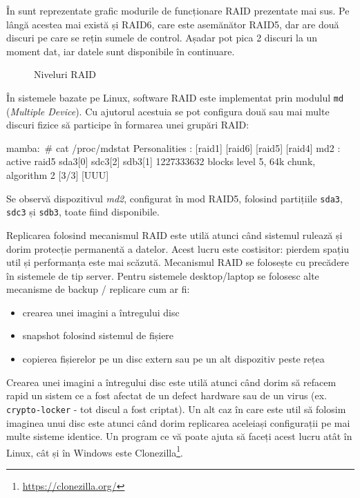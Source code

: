 În  sunt reprezentate grafic modurile de
funcționare RAID prezentate mai sus. Pe lângă acestea mai există și RAID6, care
este asemănător RAID5, dar are două discuri pe care se rețin sumele de control. Așadar
pot pica 2 discuri la un moment dat, iar datele sunt disponibile în continuare.

\begin{figure}[htbp]
  \centering
  \def\svgwidth{\columnwidth}
  
  \caption{Niveluri RAID}
  \label{fig:storage:raid}
\end{figure}

În sistemele bazate pe Linux, software RAID este implementat prin modulul \texttt{md}
(\textit{Multiple Device}). Cu ajutorul acestuia se pot configura două sau mai multe
discuri fizice să participe în formarea unei grupări RAID:

\begin{screen}
mamba:~# cat /proc/mdstat
Personalities : [raid1] [raid6] [raid5] [raid4]
md2 : active raid5 sda3[0] sdc3[2] sdb3[1]
      1227333632 blocks level 5, 64k chunk, algorithm 2 [3/3] [UUU]
\end{screen}

Se observă dispozitivul \textit{md2}, configurat în mod RAID5, folosind
partițiile \texttt{sda3}, \texttt{sdc3} și \texttt{sdb3}, toate fiind disponibile.

Replicarea folosind mecanismul RAID este utilă atunci când sistemul rulează și
dorim protecție permanentă a datelor. Acest lucru este costisitor: pierdem
spațiu util și performanța este mai scăzută. Mecanismul RAID se folosește cu
precădere în sistemele de tip server. Pentru sistemele desktop/laptop se
folosesc alte mecanisme de backup / replicare cum ar fi:

\begin{itemize}
  \item crearea unei imagini a întregului disc
  \item snapshot folosind sistemul de fișiere
  \item copierea fișierelor pe un disc extern sau pe un alt dispozitiv
    peste rețea
\end{itemize}

Crearea unei imagini a întregului disc este utilă atunci când dorim să refacem
rapid un sistem ce a fost afectat de un defect hardware sau de un virus (ex.
\texttt{crypto-locker} - tot discul a fost criptat). Un alt caz în care este util să
folosim imaginea unui disc este atunci când dorim replicarea aceleiași
configurații pe mai multe sisteme identice. Un program ce vă poate ajuta să
faceți acest lucru atât în Linux, cât și în Windows este Clonezilla\footnote{\url{https://clonezilla.org/}}.

